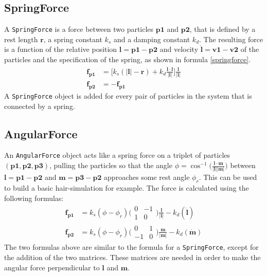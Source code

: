 \documentclass[a4paper,twoside,11pt,twocolumn]{article}
\begin{document}
\subsection{SpringForce}
A \texttt{SpringForce} is a force between two particles $\mathbf{p1}$ and $\mathbf{p2}$, that is defined by a rest length $\mathbf{r}$, a spring constant $k_s$ and a damping constant $k_d$. The resulting force is a function of the relative position $\mathbf{l = p1 - p2}$ and velocity $\mathbf{\dot{l} = v1 - v2}$ of the particles and the specification of the spring, as shown in formula \ref{springforce}.
\begin{align} \label{springforce}
	\mathbf{f_{p1}} &= \bigg[k_s(|\mathbf{l}| - \mathbf{r}) + k_d \frac{\dot{\mathbf{l}}\cdot \mathbf{l}}{|\mathbf{l}|}\bigg]\frac{\mathbf{l}}{|\mathbf{l}|}\\
	\mathbf{f_{p2}} &= -\mathbf{f_{p1}}
\end{align}
A \texttt{SpringForce} object is added for every pair of particles in the system that is connected by a spring.

\subsection{AngularForce}
An \texttt{AngularForce} object acts like a spring force on a triplet of particles $(\mathbf{p1, p2, p3})$, pulling the particles so that the angle $\phi = \cos^{-1}\bigl(\frac{\mathbf{l} \cdot \mathbf{m}}{|\mathbf{l}||\mathbf{m}|}\bigr)$ between $\mathbf{l} = \mathbf{p1} - \mathbf{p2} $ and $\mathbf{m} = \mathbf{p3} - \mathbf{p2}$ approaches some rest angle $\phi_r$. This can be used to build a basic hair-simulation for example. The force is calculated using the following formulas:
\begin{align}
	\mathbf{f_{p1}} &= k_s (\phi - \phi_r) \biggl(\begin{matrix} 0 & -1 \\ 1 & 0\end{matrix} \biggr) \frac{\mathbf{l}}{|\mathbf{l}|} - k_d (\dot{\mathbf{l}})\\
	\mathbf{f_{p2}} &= k_s (\phi - \phi_r) \biggl(\begin{matrix} 0 & 1 \\ -1 & 0\end{matrix} \biggr) \frac{\mathbf{m}}{|\mathbf{m}|} - k_d (\dot{\mathbf{m}})
\end{align}
The two formulas above are similar to the formula for a \texttt{SpringForce}, except for the addition of the two matrices. These matrices are needed in order to make the angular force perpendicular to $\mathbf{l}$ and $\mathbf{m}$.
\end{document}
